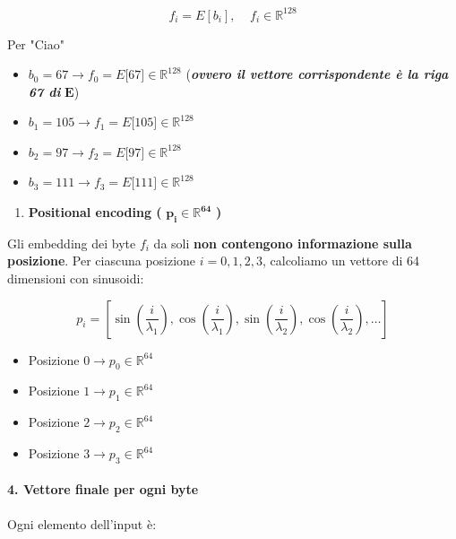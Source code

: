 \documentclass[
  11pt,
]{article}
\begin{document}
\[f_{i} = E\left\lbrack b_{i} \right\rbrack,\ \ \ \ \ f_{i} \in \mathbb{R}^{128}\]

Per "Ciao"

\begin{itemize}
\item
  \(b_{0} = 67 \rightarrow f_{0} = E\lbrack 67\rbrack \in \mathbb{R}^{128}\)
  (\emph{\textbf{ovvero il vettore corrispondente è la riga 67 di}}
  \(\mathbf{E}\))
\item
  \(b_{1} = 105 \rightarrow f_{1} = E\lbrack 105\rbrack \in \mathbb{R}^{128}\)
\item
  \(b_{2} = 97 \rightarrow f_{2} = E\lbrack 97\rbrack \in \mathbb{R}^{128}\)
\item
  \(b_{3} = 111 \rightarrow f_{3} = E\lbrack 111\rbrack \in \mathbb{R}^{128}\)
\end{itemize}

\begin{enumerate}
\def\labelenumi{\arabic{enumi}.}
\setcounter{enumi}{2}
\item
  \textbf{Positional encoding (}
  \(\mathbf{p}_{\mathbf{i}}\mathbf{\in}\mathbb{R}^{\mathbf{64}}\)
  \textbf{)}
\end{enumerate}

Gli embedding dei byte \(f_{i}\) da soli \textbf{non
contengono informazione sulla posizione}. Per ciascuna posizione
\(i = 0,1,2,3\), calcoliamo un vettore di 64 dimensioni con sinusoidi:

\[p_{i} = \left\lbrack \sin\left( \frac{i}{\lambda_{1}} \right),\cos\left( \frac{i}{\lambda_{1}} \right),\sin\left( \frac{i}{\lambda_{2}} \right),\cos\left( \frac{i}{\lambda_{2}} \right),\ldots \right\rbrack\]

\begin{itemize}
\item
  Posizione \(0 \rightarrow p_{0} \in \mathbb{R}^{64}\)
\item
  Posizione \(1 \rightarrow p_{1} \in \mathbb{R}^{64}\)
\item
  Posizione \(2 \rightarrow p_{2} \in \mathbb{R}^{64}\)
\item
  Posizione \(3 \rightarrow p_{3} \in \mathbb{R}^{64}\)
\end{itemize}

\paragraph{4. \textbf{Vettore finale per ogni byte}}

Ogni elemento dell'input è:
\end{document}
